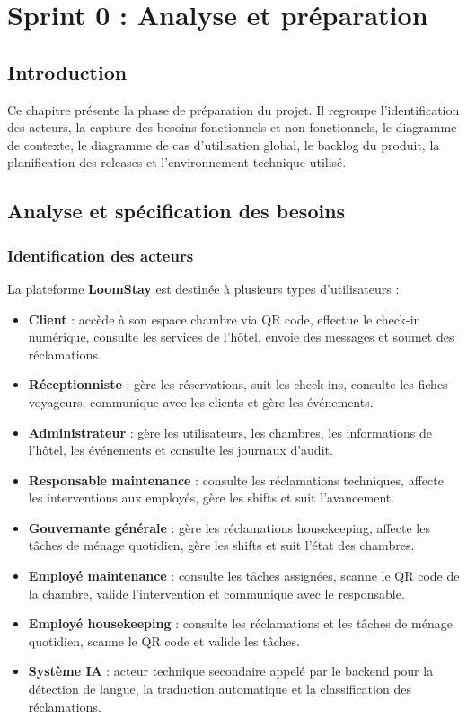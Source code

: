 \chapter{Sprint 0 : Analyse et préparation}
\label{chap:sprint0}

\section*{Introduction}
Ce chapitre présente la phase de préparation du projet. Il regroupe l'identification des acteurs, la capture des besoins fonctionnels et non fonctionnels, le diagramme de contexte, le diagramme de cas d'utilisation global, le backlog du produit, la planification des releases et l'environnement technique utilisé.

\section{Analyse et spécification des besoins}

\subsection{Identification des acteurs}
La plateforme \textbf{LoomStay} est destinée à plusieurs types d'utilisateurs :
\begin{itemize}
    \item \textbf{Client} : accède à son espace chambre via QR code, effectue le check-in numérique, consulte les services de l'hôtel, envoie des messages et soumet des réclamations.
    \item \textbf{Réceptionniste} : gère les réservations, suit les check-ins, consulte les fiches voyageurs, communique avec les clients et gère les événements.
    \item \textbf{Administrateur} : gère les utilisateurs, les chambres, les informations de l'hôtel, les événements et consulte les journaux d'audit.
    \item \textbf{Responsable maintenance} : consulte les réclamations techniques, affecte les interventions aux employés, gère les shifts et suit l'avancement.
    \item \textbf{Gouvernante générale} : gère les réclamations housekeeping, affecte les tâches de ménage quotidien, gère les shifts et suit l'état des chambres.
    \item \textbf{Employé maintenance} : consulte les tâches assignées, scanne le QR code de la chambre, valide l'intervention et communique avec le responsable.
    \item \textbf{Employé housekeeping} : consulte les réclamations et les tâches de ménage quotidien, scanne le QR code et valide les tâches.
    \item \textbf{Système IA} : acteur technique secondaire appelé par le backend pour la détection de langue, la traduction automatique et la classification des réclamations.
\end{itemize}

